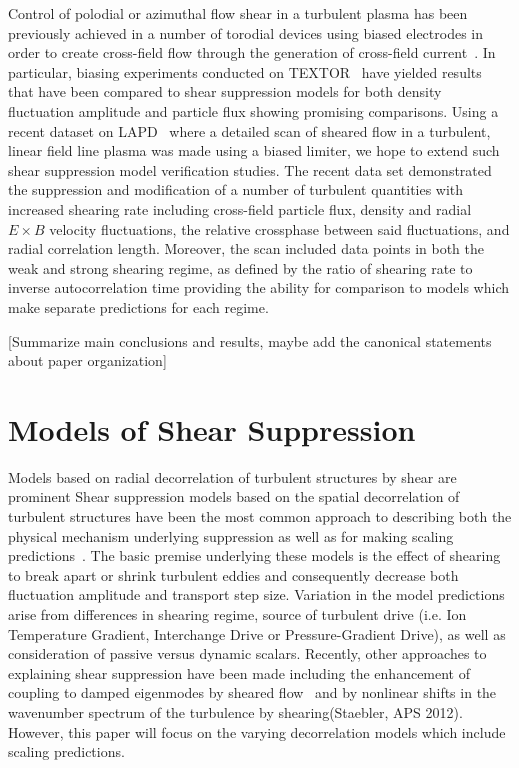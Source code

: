 \documentclass[aip,pop,amsmath,amssymb,reprint,superscriptaddress]{revtex4-1} %
\begin{document}
Control of polodial or azimuthal flow shear in a turbulent plasma has been previously achieved in a number of torodial devices using biased electrodes in order to create cross-field flow through the generation of cross-field current~\cite{taylor89,weynants92}. In particular, biasing experiments conducted on TEXTOR~\cite{weynants98,boedo00,boedo02} have yielded results that have been compared to shear suppression models for both density fluctuation amplitude and particle flux showing promising comparisons. Using a recent dataset on LAPD~\cite{schaffner12} where a detailed scan of sheared flow in a turbulent, linear field line plasma was made using a biased limiter, we hope to extend such shear suppression model verification studies. The recent data set demonstrated the suppression and modification of a number of turbulent quantities with increased shearing rate including cross-field particle flux, density and radial $E\times B$ velocity fluctuations, the relative crossphase between said fluctuations, and radial correlation length. Moreover, the scan included data points in both the weak and strong shearing regime, as defined by the ratio of shearing rate to inverse autocorrelation time providing the ability for comparison to models which make separate predictions for each regime.

[Summarize main conclusions and results, maybe add the canonical statements about paper organization]

\section{Models of Shear Suppression}

Models based on radial decorrelation of turbulent structures by shear are prominent Shear suppression models based on the spatial decorrelation of turbulent structures have been the most common approach to describing both the physical mechanism underlying suppression as well as for making scaling predictions~\cite{terry00}. The basic premise underlying these models is the effect of shearing to break apart or shrink turbulent eddies and consequently decrease both fluctuation amplitude and transport step size. Variation in the model predictions arise from differences in shearing regime, source of turbulent drive (i.e. Ion Temperature Gradient, Interchange Drive or Pressure-Gradient Drive), as well as consideration of passive versus dynamic scalars. Recently, other approaches to explaining shear suppression have been made including the enhancement of coupling to damped eigenmodes by sheared flow~\cite{terry06} and by nonlinear shifts in the wavenumber spectrum of the turbulence by shearing(Staebler, APS 2012). However, this paper will focus on the varying decorrelation models which include scaling predictions. 
\end{document}
